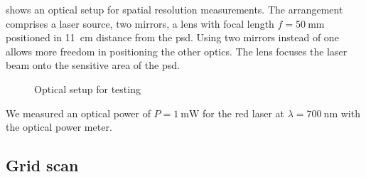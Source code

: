  shows an optical setup for spatial resolution measurements.
The arrangement comprises a laser source, two mirrors, a lens with focal length $f=\SI{50}{\milli\meter}$ positioned in \SI{11}{\centi\meter} distance from the \gls{psd}.
Using two mirrors instead of one allows more freedom in positioning the other optics.
The lens focuses the laser beam onto the sensitive area of the \gls{psd}.
\begin{figure}[htb]
	\centering
	
	\caption{Optical setup for testing}\label{fig:optical_setup}
\end{figure}
We measured an optical power of $P=\SI{1}{\milli\watt}$ for the red laser at $\lambda=\SI{700}{\nano\meter}$ with the optical power meter.

\subsection{Grid scan}

